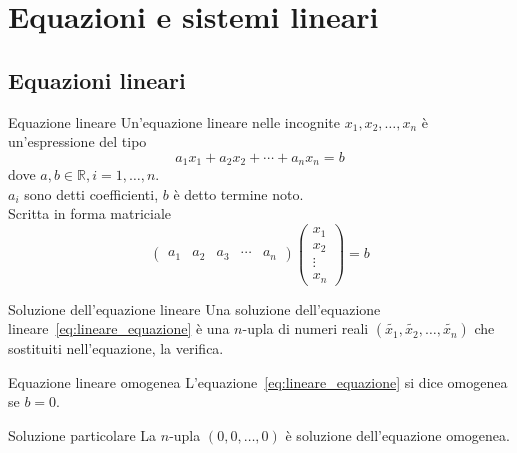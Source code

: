 
\section{Equazioni e sistemi lineari}%
\label{sec:equazioni_e_sistemi_lineari}

\subsection{Equazioni lineari}%
\label{sub:equazioni_lineari}

\begin{Def}{Equazione lineare}
  Un'equazione lineare nelle incognite $x_1,x_2,\ldots,x_n$ è un'espressione del tipo
  \begin{equation}\label{eq:lineare_equazione}
    a_1x_1+a_2x_2+\cdots+a_n x_n=b
  \end{equation}
  dove $a,b\in\mathbb{R}, i=1,\ldots,n$.\\
  $a_i$ sono detti coefficienti, $b$ è detto termine noto.\\
  Scritta in forma matriciale
  \begin{equation*}
    \begin{pmatrix}
      a_1&a_2&a_3&\cdots&a_n
    \end{pmatrix}
    \begin{pmatrix}
      x_1\\x_2\\\vdots\\x_n
    \end{pmatrix}
    = b
  \end{equation*}
\end{Def}

\begin{Def}{Soluzione dell'equazione lineare}
  Una soluzione dell'equazione lineare~\eqref{eq:lineare_equazione} è una $n$-upla di
  numeri reali
  $(\widetilde{x_1},\widetilde{x_2},\ldots,\widetilde{x_n})$ che sostituiti
  nell'equazione, la verifica.
\end{Def}

\begin{Def}{Equazione lineare omogenea}
  L'equazione~\eqref{eq:lineare_equazione} si dice omogenea se $b=0$.
\end{Def}

\begin{SubDef}{Soluzione particolare}
  La $n$-upla $(0,0,\ldots,0)$ è soluzione dell'equazione omogenea.
\end{SubDef}

